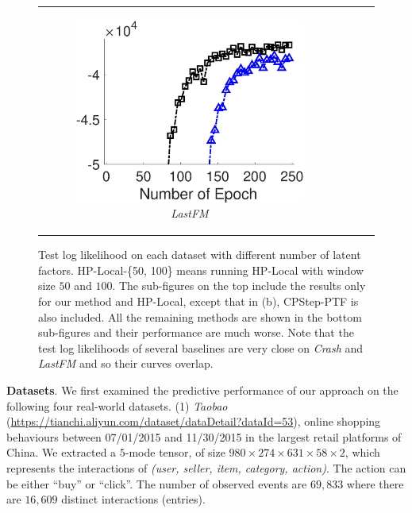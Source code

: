 \begin{figure}
\begin{tabular}[c]{cccc}
{\begin{subfigure}[t]{0.25\linewidth}
			\includegraphics[width=\linewidth]{./figs/lastfm_ll_epoch.eps}
			\caption{\textit{LastFM}}
		\end{subfigure}
	}
	\end{tabular}
	\vspace{-0.1in}
	\caption{Test log likelihood on each dataset with different number of latent factors. HP-Local-\{50, 100\} means running HP-Local with window size $50$ and $100$. The sub-figures on the top include the results only for our method and HP-Local, except that in (b), CPStep-PTF is also included. All the remaining methods are shown in the bottom sub-figures and their performance are much worse. Note that the test log likelihoods of several baselines are very close on \textit{Crash} and  \textit{LastFM} and so their curves overlap. } 	
	\label{fig:test-ll}
	\vspace{-0.2in}
\end{figure}
\textbf{Datasets}. We first examined the predictive performance of our approach on the following four real-world datasets.  (1) \textit{Taobao} (\url{https://tianchi.aliyun.com/dataset/dataDetail?dataId=53}), online shopping behaviours between 07/01/2015 and 11/30/2015 in the largest retail platforms of China. We extracted a $5$-mode tensor, of size $980 \times 274 \times  631 \times  58 \times  2$, which represents the interactions of  \textit{(user, seller, item, category, action)}. The action can be either ``buy'' or ``click''. The number of observed events are $69,833$ where there are $16,609$ distinct interactions (\ie entries). 

